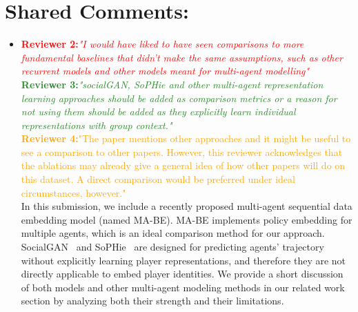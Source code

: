 \documentclass[letterpaper]{article} %
\begin{document}
\section{Shared Comments:}
\begin{itemize}
\item \textcolor{Red}{\bf Reviewer 2:}\textcolor{Red}{\it  "I would have liked to have seen comparisons to more fundamental baselines that didn't make the same assumptions, such as other recurrent models and other models meant for multi-agent modelling"}\\
\textcolor{ForestGreen}{\bf Reviewer 3:}\textcolor{ForestGreen}{\it "socialGAN, SoPHie and other multi-agent representation learning approaches should be added as comparison metrics or a reason for not using them should be added as they explicitly learn individual representations with group context."}\\
\textcolor{orange}{\bf Reviewer 4:}\textcolor{orange}{"The paper mentions other approaches and it might be
useful to see a comparison to other papers. However, this reviewer acknowledges that the ablations may already
give a general idea of how other papers will do on this dataset. A direct comparison would be preferred under ideal circumstances, however."}\\
In this submission, we include a recently proposed multi-agent sequential data embedding model (named MA-BE). MA-BE implements policy embedding for multiple agents, which is an ideal comparison method for our approach.
SocialGAN~\cite{Gupta18SocialGan} and SoPHie~\cite{Sadeghian2019SoPhie} are designed for predicting agents' trajectory without explicitly learning player representations, and therefore they are not directly applicable to embed player identities. We provide a short discussion of both models and other multi-agent modeling methods in our related work section by analyzing both their strength and their limitations. %


\end{itemize}
\end{document}
